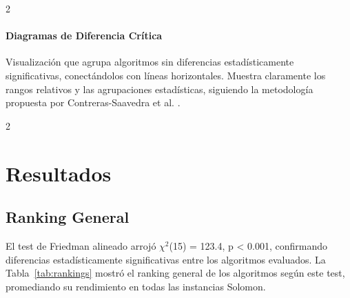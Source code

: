 \documentclass[10pt,a4paper]{extarticle}
\begin{document}
\begin{table}[!htbp]
\begin{multicols}{2}
\paragraph{Diagramas de Diferencia Crítica} Visualización que agrupa algoritmos sin diferencias estadísticamente significativas, conectándolos con líneas horizontales. Muestra claramente los rangos relativos y las agrupaciones estadísticas, siguiendo la metodología propuesta por Contreras-Saavedra et al. \cite{Contreras2024CD}.
\end{multicols}

\begin{multicols}{2}
\section{Resultados}
\subsection{Ranking General}
El test de Friedman alineado arrojó $\chi^2$(15) = 123.4, p < 0.001, confirmando diferencias estadísticamente significativas entre los algoritmos evaluados. La Tabla~\ref{tab:rankings} mostró el ranking general de los algoritmos según este test, promediando su rendimiento en todas las instancias Solomon.
\end{multicols}


\end{table}
\end{document}
